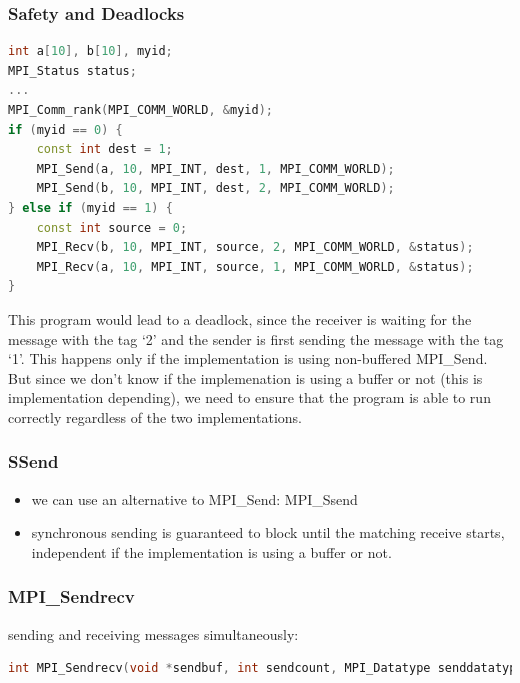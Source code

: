 \hypertarget{safety-and-deadlocks}{%
\subsubsection{Safety and Deadlocks}\label{safety-and-deadlocks}}

\begin{lstlisting}[language=C++]
int a[10], b[10], myid;
MPI_Status status;
...
MPI_Comm_rank(MPI_COMM_WORLD, &myid);
if (myid == 0) {
    const int dest = 1;
    MPI_Send(a, 10, MPI_INT, dest, 1, MPI_COMM_WORLD);
    MPI_Send(b, 10, MPI_INT, dest, 2, MPI_COMM_WORLD);
} else if (myid == 1) {
    const int source = 0;
    MPI_Recv(b, 10, MPI_INT, source, 2, MPI_COMM_WORLD, &status);
    MPI_Recv(a, 10, MPI_INT, source, 1, MPI_COMM_WORLD, &status);
}
\end{lstlisting}

This program would lead to a deadlock, since the receiver is waiting for
the message with the tag `2' and the sender is first sending the message
with the tag `1'. This happens only if the implementation is using
non-buffered MPI\_Send. But since we don't know if the implemenation is
using a buffer or not (this is implementation depending), we need to
ensure that the program is able to run correctly regardless of the two
implementations.

\clearpage
\hypertarget{ssend}{%
\subsubsection{SSend}\label{ssend}}

\begin{itemize}
\tightlist
\item
  we can use an alternative to MPI\_Send: MPI\_Ssend
\item
  synchronous sending is guaranteed to block until the matching receive
  starts, independent if the implementation is using a buffer or not.
\end{itemize}

\hypertarget{mpi_sendrecv}{%
\subsubsection{MPI\_Sendrecv}\label{mpi_sendrecv}}

sending and receiving messages simultaneously:

\begin{lstlisting}[language=C++]
int MPI_Sendrecv(void *sendbuf, int sendcount, MPI_Datatype senddatatype, int dest, int sendtag, void *recvbuf, int recvcount, MPI_Datatype recvdatatype, int source, int recvtag, MPI_Comm comm, MPI_Status *status)
\end{lstlisting}

